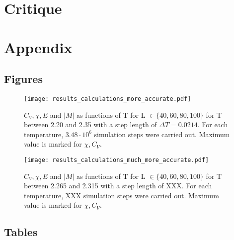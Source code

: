 \documentclass[10pt,a4paper]{article}
\begin{document}
\section{Critique}

\section{Appendix}
\subsection{Figures}
\begin{figure}[H]
\texttt{[image: results\_calculations\_more\_accurate.pdf]}
\caption[$C_V,\chi,E, |M|$ for T between 2.20 and 2.35]{$C_V,\chi,E$ and $|M|$ as functions of T for  L $ \in \{40,60,80,100\}$ for T between 2.20 and 2.35 with a step length of $\Delta T=0.0214$. For each temperature, $3.48\cdot10^6$ simulation steps were carried out. Maximum value is marked for $\chi,C_V$.}\label{for T between 2.20 and 2.35}
\end{figure}

\begin{figure}[H]
\texttt{[image: results\_calculations\_much\_more\_accurate.pdf]}
\caption[$C_V,\chi,E, |M|$ for T between 2.265 and 2.315]{$C_V,\chi,E$ and $|M|$ as functions of T for  L $ \in \{40,60,80,100\}$ for T between  2.265 and 2.315 with a step length of XXX. For each temperature, XXX simulation steps were carried out. Maximum value is marked for $\chi,C_V$.}\label{for T between 2.265 and 2.315}
\end{figure}
\subsection{Tables}
\end{document}
